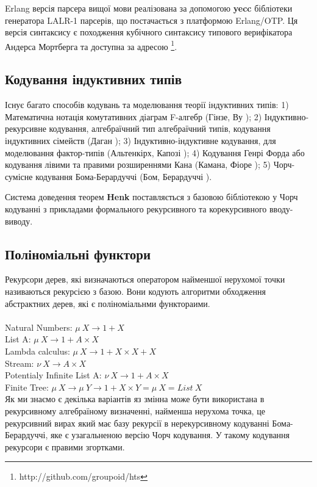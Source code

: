 \documentclass{article}
\begin{document}
Erlang версія парсера вищої мови реалізована за допомогою {\bf yecc} бібліотеки генератора LALR-1 парсерів, що постачається з платформою Erlang/OTP.
Ця версія синтаксису є походження кубічного синтаксису типового верифікатора Андерса Мортберга \cite{Mortberg17} 
та доступна за адресою \footnote{http://github.com/groupoid/hts}.

\subsection{Кодування індуктивних типів}
Існує багато способів кодувань та моделювання теорії індуктивних типів:
1) Математична нотація комутативних діаграм F-алгебр (Гінзе, Ву \cite{Hinze13});
2) Індуктивно-рекурсивне кодування, алгебраїчний тип алгебраїчний типів, кодування індуктивних сімейств (Даган \cite{Dagand13});
3) Індуктивно-індуктивне кодування, для моделювання фактор-типів (Альтенкірх, Капозі  \cite{Kaposi16});
4) Кодування Генрі Форда або кодування лівими та правими розширеннями Кана (Камана, Фіоре \cite{Hamana11});
5) Чорч-сумісне кодування Бома-Берардуччі (Бом, Берардуччі \cite{Bohm85}).

Система доведення теорем \textbf{Henk} поставляється з базовою бібліотекою у Чорч кодуванні
з прикладами формального рекурсивного та корекурсивного вводу-виводу.

\subsection{Поліноміальні функтори}
Рекурсори дерев, які визначаються оператором найменшої нерухомої точки називаються рекурсією з базою.
Вони кодують алгоритми обходження абстрактних дерев, які є поліноміальнми функтораими.
\\
\\
\noindent Natural Numbers: $\mu\ X \rightarrow 1 + X$\\
List A: $\mu\ X \rightarrow 1 + A \times X$\\
Lambda calculus: $\mu\ X \rightarrow 1 + X \times X + X$\\
Stream: $\nu\ X \rightarrow A \times X$\\
Potentialy Infinite List A: $\nu\ X \rightarrow 1 + A \times X$\\
Finite Tree: $\mu\ X \rightarrow \mu\ Y \rightarrow 1 + X \times Y = \mu\ X = List\ X$\\

Як ми знаємо є декілька варіантів яз змінна може бути використана в рекурсивному алгебраїному визначенні,
найменша нерухома точка, це рекурсивний вирах який має базу рекурсії в нерекурсивному кодуванні Бома-Берардуччі,
яке є узагальненою версію Чорч кодування. У такому кодування рекурсори є правими згортками.
\end{document}
